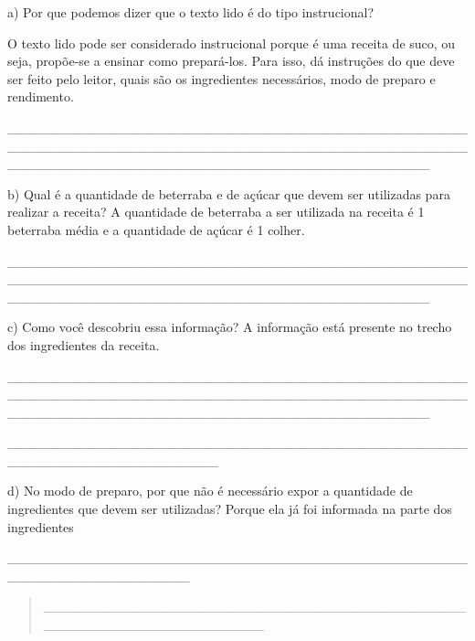 \begin{itemize}
{{{\begin{itemize}
a) Por que podemos dizer que o texto lido é do tipo instrucional?

O texto lido pode ser considerado instrucional porque é uma receita de
suco, ou seja, propõe-se a ensinar como prepará-los. Para isso, dá
instruções do que deve ser feito pelo leitor, quais são os ingredientes
necessários, modo de preparo e rendimento.

\_\_\_\_\_\_\_\_\_\_\_\_\_\_\_\_\_\_\_\_\_\_\_\_\_\_\_\_\_\_\_\_\_\_\_\_\_\_\_\_\_\_\_\_\_\_\_\_\_\_\_\_\_\_\_\_\_\_\_\_\_\_\_\_\_\_\_\_\_\_\_\_\_\_\_\_\_\_\_\_\_\_\_\_\_\_\_\_\_\_\_\_\_\_\_\_\_\_\_\_\_\_\_\_\_\_\_\_\_\_\_\_\_\_\_\_\_\_\_\_\_\_\_\_\_\_\_\_\_\_\_\_\_\_\_\_\_\_\_\_

b) Qual é a quantidade de beterraba e de açúcar que devem ser utilizadas
para realizar a receita? A quantidade de beterraba a ser utilizada na
receita é 1 beterraba média e a quantidade de açúcar é 1 colher.

\_\_\_\_\_\_\_\_\_\_\_\_\_\_\_\_\_\_\_\_\_\_\_\_\_\_\_\_\_\_\_\_\_\_\_\_\_\_\_\_\_\_\_\_\_\_\_\_\_\_\_\_\_\_\_\_\_\_\_\_\_\_\_\_\_\_\_\_\_\_\_\_\_\_\_\_\_\_\_\_\_\_\_\_\_\_\_\_\_\_\_\_\_\_\_\_\_\_\_\_\_\_\_\_\_\_\_\_\_\_\_\_\_\_\_\_\_\_\_\_\_\_\_\_\_\_\_\_\_\_\_\_\_\_\_\_\_\_\_\_

c) Como você descobriu essa informação? A informação está presente no
trecho dos ingredientes da receita.

\_\_\_\_\_\_\_\_\_\_\_\_\_\_\_\_\_\_\_\_\_\_\_\_\_\_\_\_\_\_\_\_\_\_\_\_\_\_\_\_\_\_\_\_\_\_\_\_\_\_\_\_\_\_\_\_\_\_\_\_\_\_\_\_\_\_\_\_\_\_\_\_\_\_\_\_\_\_\_\_\_\_\_\_\_\_\_\_\_\_\_\_\_\_\_\_\_\_\_\_\_\_\_\_\_\_\_\_\_\_\_\_\_\_\_\_\_\_\_\_\_\_\_\_\_\_\_\_\_\_\_\_\_\_\_\_\_\_\_\_

\_\_\_\_\_\_\_\_\_\_\_\_\_\_\_\_\_\_\_\_\_\_\_\_\_\_\_\_\_\_\_\_\_\_\_\_\_\_\_\_\_\_\_\_\_\_\_\_\_\_\_\_\_\_\_\_\_\_\_\_\_\_\_\_\_\_\_\_\_\_

\protect\hypertarget{_Hlk127460239}{}{}

d) No modo de preparo, por que não é necessário expor a quantidade de
ingredientes que devem ser utilizadas? Porque ela já foi informada na
parte dos ingredientes

\_\_\_\_\_\_\_\_\_\_\_\_\_\_\_\_\_\_\_\_\_\_\_\_\_\_\_\_\_\_\_\_\_\_\_\_\_\_\_\_\_\_\_\_\_\_\_\_\_\_\_\_\_\_\_\_\_\_\_\_\_\_\_\_\_\_\_

\begin{quote}
\_\_\_\_\_\_\_\_\_\_\_\_\_\_\_\_\_\_\_\_\_\_\_\_\_\_\_\_\_\_\_\_\_\_\_\_\_\_\_\_\_\_\_\_\_\_\_\_\_\_\_\_\_\_\_\_\_\_\_\_\_\_\_\_\_\_\_
\end{quote}


\end{itemize}}}}
\end{itemize}
